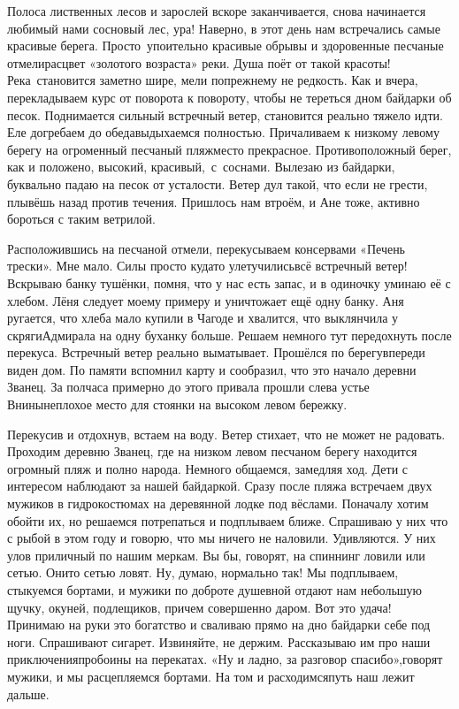 Полоса лиственных лесов и зарослей вскоре заканчивается, снова начинается любимый нами сосновый лес, ура! Наверно, в этот день нам встречались самые красивые берега. Просто~упоительно красивые обрывы и здоровенные песчаные отмели\mdash расцвет «золотого возраста» реки. Душа поёт от такой красоты! Река~становится заметно шире, мели по\sdash прежнему не редкость. Как и вчера, перекладываем курс от поворота к повороту, чтобы не тереться дном байдарки об песок. Поднимается сильный встречный ветер, становится реально тяжело идти. Еле догребаем до обеда\mdash выдыхаемся полностью. Причаливаем к низкому левому берегу на огроменный песчаный пляж\mdash место прекрасное. Противоположный берег, как и положено, высокий, красивый,~с~соснами. Вылезаю из байдарки, буквально падаю на песок от усталости. Ветер дул такой, что если не грести, плывёшь назад против течения. Пришлось нам втроём, и Ане тоже, активно бороться с таким ветрилой. 

Расположившись на песчаной отмели, перекусываем консервами «Печень трески». Мне мало. Силы просто куда\sdash то улетучились\mdash всё встречный ветер! Вскрываю банку тушёнки, помня, что у нас есть запас, и в одиночку уминаю её с хлебом. Лёня следует моему примеру и уничтожает ещё одну банку. Аня ругается, что хлеба мало купили в Чагоде и хвалится, что выклянчила у скряги\sdash Адмирала на одну буханку больше. Решаем немного тут передохнуть после перекуса. Встречный ветер реально выматывает. Прошёлся по берегу\mdash впереди виден дом. По памяти вспомнил карту и сообразил, что это начало деревни Званец. За полчаса примерно до этого привала прошли слева устье Внины\mdash неплохое место для стоянки на высоком левом бережку. 

Перекусив и отдохнув, встаем на воду. Ветер стихает, что не может не радовать. Проходим деревню Званец, где на низком левом песчаном берегу находится огромный пляж и полно народа. Немного общаемся, замедляя ход. Дети с интересом наблюдают за нашей байдаркой. Сразу после пляжа встречаем двух мужиков в гидрокостюмах на деревянной лодке под вёслами. Поначалу хотим обойти их, но решаемся потрепаться и подплываем ближе. Спрашиваю у них что с рыбой в этом году и говорю, что мы ничего не наловили. Удивляются. У них улов приличный по нашим меркам. Вы бы, говорят, на спиннинг ловили или сетью. Они\sdash то сетью ловят. Ну, думаю, нормально так! Мы подплываем, стыкуемся бортами, и мужики по доброте душевной отдают нам небольшую щучку, окуней, подлещиков, причем совершенно даром. Вот это удача! Принимаю на руки это богатство и сваливаю прямо на дно байдарки себе под ноги. Спрашивают сигарет. Извиняйте, не держим. Рассказываю им про наши приключения\mdash пробоины на перекатах. «Ну и ладно, за разговор спасибо»,\mdash говорят мужики, и мы расцепляемся бортами. На том и расходимся\mdash путь наш лежит дальше.

